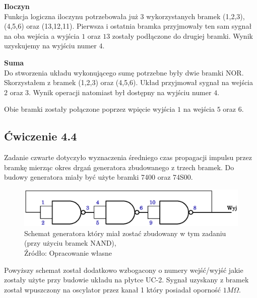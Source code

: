 \documentclass{article}
\begin{document}
        \textbf{Iloczyn} \\
        Funkcja logiczna iloczynu potrzebowała już 3 wykorzystanych bramek (1,2,3), (4,5,6) oraz (13,12,11). Pierwsza i ostatnia bramka przyjmowały ten sam sygnał na oba wejścia a wyjścia $1$ oraz $13$ zostały podłączone do drugiej bramki. Wynik uzyskujemy na wyjściu numer $4$.

        \textbf{Suma} \\
        Do stworzenia układu wykonującego sumę potrzebne były dwie bramki NOR. Skorzystałem z bramek (1,2,3) oraz (4,5,6). Układ przyjmował sygnał na wejścia $2$ oraz $3$. Wynik operacji natomiast był dostępny na wyjściu numer $4$.

        Obie bramki zostały połączone poprzez wpięcie wyjścia $1$ na wejścia $5$ oraz $6$.

    \subsection{Ćwiczenie 4.4}
      Zadanie czwarte dotyczyło wyznaczenia średniego czas propagacji impulsu przez bramkę mierząc okres drgań generatora zbudowanego z trzech bramek. Do budowy generatora miały być użyte bramki 7400 oraz 74S00.

        \begin{figure}[!ht]
          \centering
          \includegraphics[scale=0.55]{grafiki/3_NAND.eps}
          \caption{Schemat generatora który miał zostać zbudowany w tym zadaniu (przy użyciu bramek NAND),
          \\Źródło: Opracowanie własne}
        \end{figure}
      Powyższy schemat został dodatkowo wzbogacony o numery wejść/wyjść jakie zostały użyte przy budowie układu na płytce UC-2.
      Sygnał uzyskany z bramek został wpuszczony na oscylator przez kanał 1 który posiadał oporność $1M\Omega$.

      \pagebreak
\end{document}
